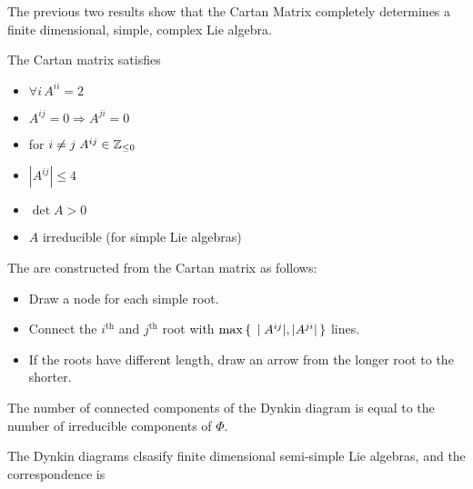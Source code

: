 \documentclass{article}
\begin{document}
\begin{idea}
	The previous two results show that the Cartan Matrix completely determines a finite dimensional, simple, complex Lie algebra. 
\end{idea}

\begin{theorem}
	The Cartan matrix satisfies
	\begin{itemize}
		\item $\forall i \, A^{ii}=2$
		\item $A^{ij}=0 \Rightarrow A^{ji}=0$
		\item for $i \neq j \; A^{ij}\in\mathbb{Z}_{\leq0}$
		\item $|A^{ij}|\leq4$
		\item $\det{A}>0$
		\item $A$ irreducible (for simple Lie algebras)
	\end{itemize}
\end{theorem}

\begin{definition}
	The  are constructed from the Cartan matrix as follows:
	\begin{itemize}
		\item Draw a node for each simple root.
		\item Connect the $i^{\text{th}}$ and $j^\text{th}$ root with $\max\set{  |A^{ij}|, |A^{ji}|  }$ lines. 
		\item If the roots have different length, draw an arrow from the longer root to the shorter. 
	\end{itemize}
\end{definition}

\begin{prop}
	The number of connected components of the Dynkin diagram is equal to the number of irreducible components of $\Phi$. 
\end{prop}

\begin{theorem}
	The Dynkin diagrams clsasify finite dimensional semi-simple Lie algebras, and the correspondence is 
\end{theorem}

\end{document}
